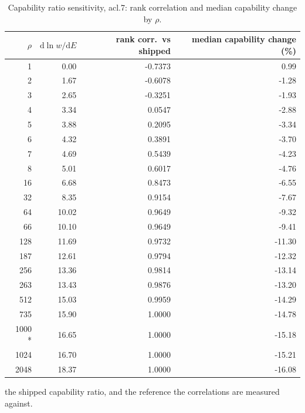 \begin{table}[htbp]
  \centering
  \caption{Capability ratio sensitivity, acl.7: rank correlation and median capability change by $\rho$.}
  \label{tab:rho-acl-7-summary}
  \begin{tabular}{r r r r}
    \toprule
    $\rho$ & $\mathrm{d}\ln w/\mathrm{d}E$ & rank corr.\ vs shipped & median capability change (\%) \\
    \midrule
    1 & 0.00 & -0.7373 & 0.99 \\
    2 & 1.67 & -0.6078 & -1.28 \\
    3 & 2.65 & -0.3251 & -1.93 \\
    4 & 3.34 & 0.0547 & -2.88 \\
    5 & 3.88 & 0.2095 & -3.34 \\
    6 & 4.32 & 0.3891 & -3.70 \\
    7 & 4.69 & 0.5439 & -4.23 \\
    8 & 5.01 & 0.6017 & -4.76 \\
    16 & 6.68 & 0.8473 & -6.55 \\
    32 & 8.35 & 0.9154 & -7.67 \\
    64 & 10.02 & 0.9649 & -9.32 \\
    66 & 10.10 & 0.9649 & -9.41 \\
    128 & 11.69 & 0.9732 & -11.30 \\
    187 & 12.61 & 0.9794 & -12.32 \\
    256 & 13.36 & 0.9814 & -13.14 \\
    263 & 13.43 & 0.9876 & -13.20 \\
    512 & 15.03 & 0.9959 & -14.29 \\
    735 & 15.90 & 1.0000 & -14.78 \\
    1000 * & 16.65 & 1.0000 & -15.18 \\
    1024 & 16.70 & 1.0000 & -15.21 \\
    2048 & 18.37 & 1.0000 & -16.08 \\
    \bottomrule
  \end{tabular}
  \par\smallskip\footnotesize * the shipped capability ratio, and the reference the correlations are measured against.
\end{table}
